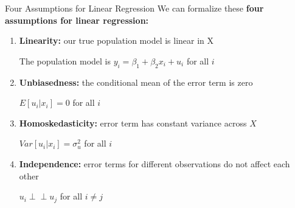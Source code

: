 \documentclass[
  ignorenonframetext,
  english,
]{beamer}
\begin{document}
\begin{frame}{Four Assumptions for Linear Regression}
\protect{}\label{four-assumptions-for-linear-regression}
We can formalize these \textbf{four assumptions for linear regression:}

\begin{enumerate}
[1)]
\item
  \textbf{Linearity:} our true population model is linear in X

  The population model is \(y_i=\beta_1+\beta_2x_i+u_i\) for all \(i\)
\end{enumerate}

\pause

\begin{enumerate}
[1)]
\setcounter{enumi}{1}
\item
  \textbf{Unbiasedness:} the conditional mean of the error term is zero

  \(E[u_i|x_i]=0\) for all \(i\)
\end{enumerate}

\pause

\begin{enumerate}
[1)]
\setcounter{enumi}{2}
\item
  \textbf{Homoskedasticity:} error term has constant variance across
  \(X\)

  \(Var[u_i|x_i]=\sigma^2_u\) for all \(i\)
\end{enumerate}

\pause

\begin{enumerate}
[1)]
\setcounter{enumi}{3}
\item
  \textbf{Independence:} error terms for different observations do not
  affect each other

  \(u_i \perp \!\!\! \perp u_j\) for all \(i\neq j\)
\end{enumerate}
\end{frame}

\end{document}
